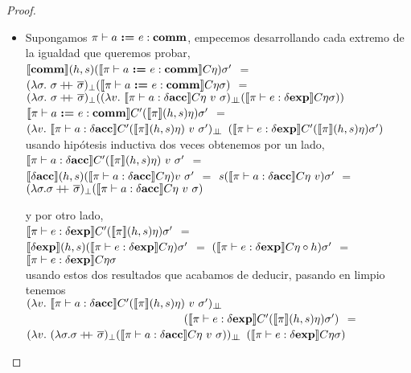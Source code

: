 \begin{proof}
\begin{itemize}
\begin{itemize}
\item Supongamos $\pi \vdash a \ \textbf{:=} \ e : \textbf{comm}$, empecemos desarrollando cada
extremo de la igualdad que queremos probar,\\

$\llbracket \textbf{comm} \rrbracket(h,s)(\llbracket \pi \vdash a \ \textbf{:=} \ e : \textbf{comm} \rrbracket C\eta)\sigma'$ $=$\\
$(\lambda \sigma. \ \sigma +\kern-1.3ex+\kern0.8ex \overline{\sigma})_{\bot}
				(\llbracket \pi \vdash a \ \textbf{:=} \ e : \textbf{comm} \rrbracket C\eta\sigma)$ $=$\\
$(\lambda \sigma. \ \sigma \concat \sigmaover)_{\bot}(
	(\lambda v. \ \semBrcks{\pi \vdash a : \deltaacc}C\eta \ v \ \sigma)_{\dbot}
	(\semBrcks{\pi \vdash e : \deltaexp}C\eta\sigma))$\\
	
$\llbracket \pi \vdash a \ \textbf{:=} \ e : \textbf{comm} \rrbracket C'(\llbracket \pi \rrbracket(h,s)\eta)\sigma'$ $=$\\
$(\lambda v. \ 
	\semBrcks{\pi \vdash a : \deltaacc}C'(\semBrcks{\pi}(h,s)\eta)\ v \ \sigma')_{\dbot}$
$(\llbracket \pi \vdash e : \delta \textbf{exp} \rrbracket C'(\llbracket \pi \rrbracket(h,s)\eta)\sigma')$ \\

usando hip\'otesis inductiva dos veces obtenemos por un lado,\\

$\llbracket \pi \vdash a : \delta \textbf{acc} \rrbracket C'(\llbracket \pi \rrbracket(h,s)\eta)\ v \ \sigma'$ $=$\\
$\llbracket \delta \textbf{acc} \rrbracket(h,s)(\llbracket \pi \vdash a : \delta \textbf{acc} \rrbracket C\eta) v \ \sigma'$ $=$
$s(\llbracket \pi \vdash a : \delta \textbf{acc} \rrbracket C \eta \ v)\sigma'$ $=$\\
$(\lambda \sigma . \sigma \concat \sigmaover)_{\bot}
				(\semBrcks{\pi \vdash a : \deltaacc} C \eta \ v \ \sigma)$
				
y por otro lado,\\

$\llbracket \pi \vdash e : \delta \textbf{exp} \rrbracket C'(\llbracket \pi \rrbracket(h,s)\eta)\sigma'$ $=$\\
$\llbracket \delta \textbf{exp} \rrbracket(h,s)(\llbracket \pi \vdash e : \delta \textbf{exp} \rrbracket C \eta)\sigma'$ $=$
$(\llbracket \pi \vdash e : \delta \textbf{exp} \rrbracket C \eta \circ h)\sigma'$ $=$\\
$\llbracket \pi \vdash e : \delta \textbf{exp} \rrbracket C \eta \sigma$\\

usando estos dos resultados que acabamos de deducir, pasando en limpio tenemos\\

$(\lambda v. \ 
	\semBrcks{\pi \vdash a : \deltaacc}C'(\semBrcks{\pi}(h,s)\eta)\ v \ \sigma')_{\dbot}$\\
\indent \ \ \ \ \ \ \ \ \ \ \ \ \ \ \ \ \ \ \ \ \ \ \ \ \ \ \ \
$(\llbracket \pi \vdash e : \delta \textbf{exp} \rrbracket C'(\llbracket \pi \rrbracket(h,s)\eta)\sigma')$ $=$\\
$(\lambda v. \ (\lambda \sigma . \sigma \concat \sigmaover)_{\bot}
				(\semBrcks{\pi \vdash a : \deltaacc} C \eta \ v \ \sigma))_{\dbot}$
$(\llbracket \pi \vdash e : \delta \textbf{exp} \rrbracket C \eta \sigma)$ \\


\end{itemize}
\end{itemize}
\end{proof}
